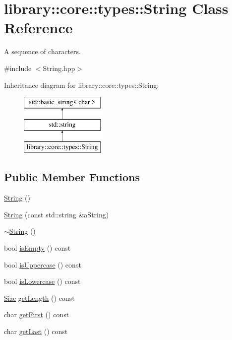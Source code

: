 \hypertarget{classlibrary_1_1core_1_1types_1_1String}{}\section{library\+:\+:core\+:\+:types\+:\+:String Class Reference}
\label{classlibrary_1_1core_1_1types_1_1String}


A sequence of characters.  




{\ttfamily \#include $<$String.\+hpp$>$}

Inheritance diagram for library\+:\+:core\+:\+:types\+:\+:String\+:\begin{figure}[H]
\begin{center}
\leavevmode
\includegraphics[height=3.000000cm]{classlibrary_1_1core_1_1types_1_1String}
\end{center}
\end{figure}
\subsection*{Public Member Functions}
\begin{DoxyCompactItemize}
\item 
\hyperlink{classlibrary_1_1core_1_1types_1_1String_ab49dec039a75f0049c95759141b6d484}{String} ()
\item 
\hyperlink{classlibrary_1_1core_1_1types_1_1String_a37c737528805786c49eab397ba7b64ae}{String} (const std\+::string \&a\+String)
\item 
\hyperlink{classlibrary_1_1core_1_1types_1_1String_a97f9b0024a58372a0281b25e2811f3bf}{$\sim$\+String} ()
\item 
bool \hyperlink{classlibrary_1_1core_1_1types_1_1String_a1981fee5619389b46c786afa7aadc251}{is\+Empty} () const
\item 
bool \hyperlink{classlibrary_1_1core_1_1types_1_1String_a6d12c373b22a062cfa0270204fc998f5}{is\+Uppercase} () const
\item 
bool \hyperlink{classlibrary_1_1core_1_1types_1_1String_a3620d335dd5b14029a3a67e75c79be81}{is\+Lowercase} () const
\item 
\hyperlink{namespacelibrary_1_1core_1_1types_a701626ea1027888ebbb8cfd0ff7adab0}{Size} \hyperlink{classlibrary_1_1core_1_1types_1_1String_adc97f82ccc9a3d034bc3127e643199fb}{get\+Length} () const
\item 
char \hyperlink{classlibrary_1_1core_1_1types_1_1String_ad695264b765448ecf4f8617553012eee}{get\+First} () const
\item 
char \hyperlink{classlibrary_1_1core_1_1types_1_1String_aae3aaf5e3b3fde3f7b90fd1ee431c9d4}{get\+Last} () const
\end{DoxyCompactItemize}
